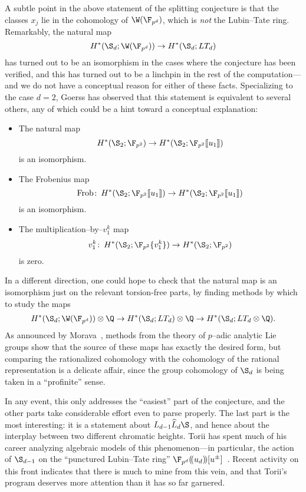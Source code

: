 A subtle point in the above statement of the splitting conjecture is that the classes \(x_j\) lie in the cohomology of \(\W(\F_{p^d})\), which is \emph{not} the Lubin--Tate ring.  Remarkably, the natural map \[H^*(\S_d; \W(\F_{p^d})) \to H^*(\S_d; LT_d)\] has turned out to be an isomorphism in the cases where the conjecture has been verified, and this has turned out to be a linchpin in the rest of the computation---and we do not have a conceptual reason for either of these facts.  Specializing to the case \(d = 2\), Goerss has observed that this statement is equivalent to several others, any of which could be a hint toward a conceptual explanation:
\begin{itemize}
    \item The natural map \[H^*(\S_2; \F_{p^2}) \to H^*(\S_2; \F_{p^2}\ps{u_1})\] is an isomorphism.
    \item The Frobenius map \[\Frob\co H^*(\S_2; \F_{p^2}\ps{u_1}) \to H^*(\S_2; \F_{p^2}\ps{u_1})\] is an isomorphism.
    \item The multiplication--by--\(v_1^k\) map \[v_1^k\co H^*(\S_2; \F_{p^2}\{v_1^k\}) \to H^*(\S_2; \F_{p^2})\] is zero.
\end{itemize}
In a different direction, one could hope to check that the natural map is an isomorphism just on the relevant torsion-free parts, by finding methods by which to study the maps
\begin{align*}
H^*(\S_d; \W(\F_{p^d})) \otimes \Q \to H^*(\S_d; LT_d) \otimes \Q \to H^*(\S_d; LT_d \otimes \Q).
\end{align*}
As announced by Morava~\cite[Remark 2.2.5]{MoravaCobordismComodules}, methods from the theory of \(p\)--adic analytic Lie groups show that the source of these maps has exactly the desired form, but comparing the rationalized cohomology with the cohomology of the rational representation is a delicate affair, since the group cohomology of \(\S_d\) is being taken in a ``profinite'' sense.

In any event, this only addresses the ``easiest'' part of the conjecture, and the other parts take considerable effort even to parse properly.  The last part is the most interesting: it is a statement about \(L_{d-1} \widehat L_d \S\), and hence about the interplay between two different chromatic heights.  Torii has spent much of his career analyzing algebraic models of this phenomenon---in particular, the action of \(\S_{d-1}\) on the ``punctured Lubin--Tate ring'' \(\F_{p^d}(\!(u_d)\!)[u^\pm]\)~\cite{Torii1,Torii2,Torii4,Torii3,Torii5}.  Recent activity on this front indicates that there is much to mine from this vein, and that Torii's program deserves more attention than it has so far garnered.


